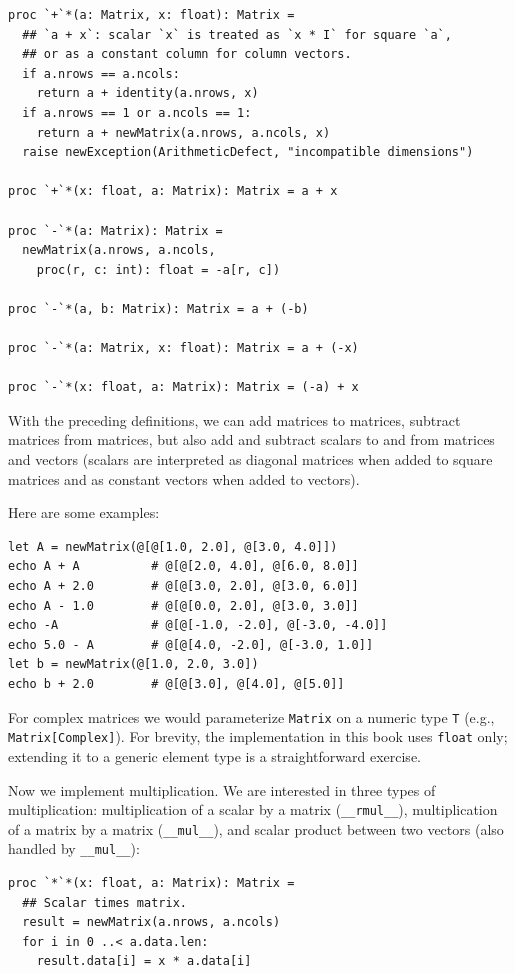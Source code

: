 \documentclass[justified, sixbynine]{tufte-book}
\def\ft{\small\tt}
\theoremstyle{plain}%
\newtheorem * {corollary}{Corollary}
\theoremstyle{definition}
\theoremstyle{remark}
\newtheorem * {remark}{Remark}
\newtheorem * {note}{Note}
\begin{document}
\begin{fullwidth}
\begin{lstlisting}[caption={in file: {\ft nlib/matrix.nim}}]
proc `+`*(a: Matrix, x: float): Matrix =
  ## `a + x`: scalar `x` is treated as `x * I` for square `a`,
  ## or as a constant column for column vectors.
  if a.nrows == a.ncols:
    return a + identity(a.nrows, x)
  if a.nrows == 1 or a.ncols == 1:
    return a + newMatrix(a.nrows, a.ncols, x)
  raise newException(ArithmeticDefect, "incompatible dimensions")

proc `+`*(x: float, a: Matrix): Matrix = a + x

proc `-`*(a: Matrix): Matrix =
  newMatrix(a.nrows, a.ncols,
    proc(r, c: int): float = -a[r, c])

proc `-`*(a, b: Matrix): Matrix = a + (-b)

proc `-`*(a: Matrix, x: float): Matrix = a + (-x)

proc `-`*(x: float, a: Matrix): Matrix = (-a) + x
\end{lstlisting}
With the preceding definitions, we can add matrices to matrices, subtract matrices from matrices, but also add and subtract scalars to and from matrices and vectors
(scalars are interpreted as diagonal matrices when added to square matrices and as constant vectors when added to vectors).

Here are some examples:

\begin{lstlisting}
let A = newMatrix(@[@[1.0, 2.0], @[3.0, 4.0]])
echo A + A          # @[@[2.0, 4.0], @[6.0, 8.0]]
echo A + 2.0        # @[@[3.0, 2.0], @[3.0, 6.0]]
echo A - 1.0        # @[@[0.0, 2.0], @[3.0, 3.0]]
echo -A             # @[@[-1.0, -2.0], @[-3.0, -4.0]]
echo 5.0 - A        # @[@[4.0, -2.0], @[-3.0, 1.0]]
let b = newMatrix(@[1.0, 2.0, 3.0])
echo b + 2.0        # @[@[3.0], @[4.0], @[5.0]]
\end{lstlisting}

For complex matrices we would parameterize {\ft Matrix} on a numeric type {\ft T} (e.g., {\ft Matrix[Complex]}). For brevity, the implementation in this book uses {\ft float} only; extending it to a generic element type is a straightforward exercise.


Now we implement multiplication. We are interested in three types of multiplication: multiplication of a scalar by a matrix ({\ft \_\_rmul\_\_}), multiplication of a matrix by a matrix ({\ft \_\_mul\_\_}), and scalar product between two vectors (also handled by {\ft \_\_mul\_\_}):

\begin{lstlisting}[caption={in file: {\ft nlib/matrix.nim}}]
proc `*`*(x: float, a: Matrix): Matrix =
  ## Scalar times matrix.
  result = newMatrix(a.nrows, a.ncols)
  for i in 0 ..< a.data.len:
    result.data[i] = x * a.data[i]


\end{lstlisting}
\end{fullwidth}
\end{document}
